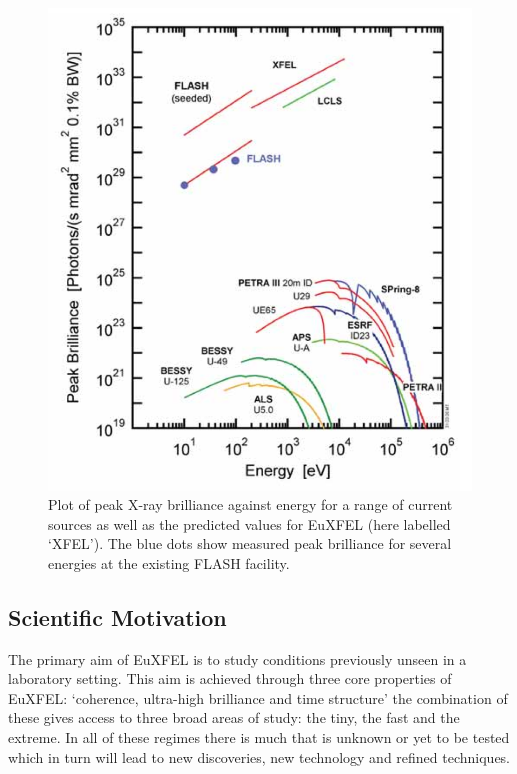 \begin{figure}[h]
  \centering
    \includegraphics[width=.9\textwidth]{images/Other/XFEL-comparitive_energy-brightness.png}
  \caption{Plot of peak X-ray brilliance against energy for a range of current sources as well as the predicted values for EuXFEL (here labelled `XFEL'). The blue dots show measured peak brilliance for several energies at the existing FLASH facility.}
  \label{fig:xfel-brightness}
\end{figure}

\subsection{Scientific Motivation} %
\label{sub:scientific_motivation}
The primary aim of EuXFEL is to study conditions previously unseen in a laboratory setting. This aim is achieved through three core properties of EuXFEL: `coherence, ultra-high brilliance and time structure' \cite{CITEATION FOR THE TDR} the combination of these gives access to three broad areas of study: the tiny, the fast and the extreme. In all of these regimes there is much that is unknown or yet to be tested which in turn will lead to new discoveries, new technology and refined techniques.

